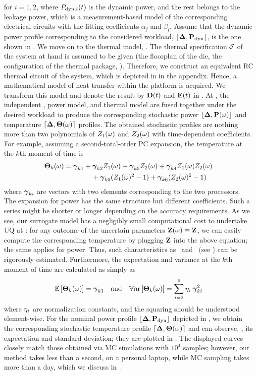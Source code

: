 for $i = 1, 2$, where $P_{\text{dyn}, i}(t)$ is the dynamic power, and the rest belongs to the leakage power, which is a measurement-based model of the corresponding electrical circuits with the fitting coefficients $\alpha_j$ and $\beta_i$. Assume that the dynamic power profile corresponding to the considered workload, $\profPdyn$, is the one shown in . We move on to the thermal model, . The thermal specification $\mathcal{S}$ of the system at hand is assumed to be given (the floorplan of the die, the configuration of the thermal package, \etc). Therefore, we construct an equivalent RC thermal circuit of the system, which is depicted in  in the appendix. Hence, a mathematical model of heat transfer within the platform is acquired. We transform this model and denote the result by $\mCF(\t)$ and $\mCS(\t)$ in . At , the independent \rvs, power model, and thermal model are fused together under the desired workload to produce the corresponding stochastic power $\profP{\o}$ and temperature $\profT{\o}$ profiles. The obtained stochastic profiles are nothing more than two polynomials of $Z_1(\omega)$ and $Z_2(\omega)$ with time-dependent coefficients. For example, assuming a second-total-order PC expansion, the temperature at the $k$th moment of time is
\begin{align*}
  {\boldsymbol\Theta}_k(\omega) &= {\boldsymbol\gamma}_{k1} + {\boldsymbol\gamma}_{k2} Z_1(\omega) + {\boldsymbol\gamma}_{k3} Z_2(\omega) + {\boldsymbol\gamma}_{k4} Z_1(\omega) Z_2(\omega) \\
  & \qquad \qquad {} + {\boldsymbol\gamma}_{k5} (Z_1(\omega)^2 - 1) + {\boldsymbol\gamma}_{k6} (Z_2(\omega)^2 - 1)
\end{align*}
where ${\boldsymbol\gamma}_{ki}$ are vectors with two elements corresponding to the two processors. The expansion for power has the same structure but different coefficients. Such a series might be shorter or longer depending on the accuracy requirements. As we see, our surrogate model has a negligibly small computational cost to undertake UQ at : for any outcome of the uncertain parameters $\mathbf{Z}(\omega) \equiv \mathbf{Z}$, we can easily compute the corresponding temperature by plugging $\mathbf{Z}$ into the above equation; the same applies for power. Thus, such characteristics as \cdfs\ and \pdfs\ (see ) can be rigorously estimated. Furthermore, the expectation and variance at the $k$th moment of time are calculated as simply as
\[
  \mathbb{E}\left[{\boldsymbol\Theta}_k(\omega)\right] = {\boldsymbol\gamma}_{k1} \hspace{1em} \text{and} \hspace{1em} \mathbb{V}\text{ar}\left[{\boldsymbol\Theta}_k(\omega)\right] = \sum_{i = 2}^{6} \eta_i \: {\boldsymbol\gamma}_{ki}^2
\]
where $\eta_i$ are normalization constants, and the squaring should be understood element-wise. For the nominal power profile $\profPdyn$ depicted in , we obtain the corresponding stochastic temperature profile $\profT{\o}$ and can observe, \eg, its expectation and standard deviation; they are plotted in . The displayed curves closely match those obtained via MC simulations with $10^4$ samples; however, our method takes less than a second, on a personal laptop, while MC sampling takes more than a day, which we discuss in .

